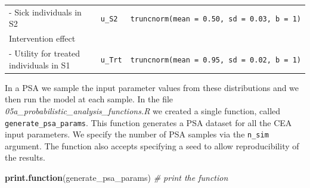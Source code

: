 \documentclass[]{book}
\newenvironment{Shaded}{\begin{snugshade}}{\end{snugshade}}
\newcommand{\KeywordTok}[1]{\textcolor[rgb]{0.13,0.29,0.53}{\textbf{#1}}}
\newcommand{\CommentTok}[1]{\textcolor[rgb]{0.56,0.35,0.01}{\textit{#1}}}
\newcommand{\NormalTok}[1]{#1}
\begin{document}
\begin{longtable}[]{@{}lll@{}}
\begin{minipage}[t]{0.33\columnwidth}
- Sick individuals in S2\strut
\end{minipage} & \begin{minipage}[t]{0.13\columnwidth}\raggedright\strut
\texttt{u\_S2}\strut
\end{minipage} & \begin{minipage}[t]{0.45\columnwidth}\raggedright\strut
\texttt{truncnorm(mean\ =\ 0.50,\ sd\ =\ 0.03,\ b\ =\ 1)}\strut
\end{minipage}\tabularnewline
\begin{minipage}[t]{0.33\columnwidth}\raggedright\strut
Intervention effect\strut
\end{minipage} & \begin{minipage}[t]{0.13\columnwidth}\raggedright\strut
\strut
\end{minipage} & \begin{minipage}[t]{0.45\columnwidth}\raggedright\strut
\strut
\end{minipage}\tabularnewline
\begin{minipage}[t]{0.33\columnwidth}\raggedright\strut
- Utility for treated individuals in S1\strut
\end{minipage} & \begin{minipage}[t]{0.13\columnwidth}\raggedright\strut
\texttt{u\_Trt}\strut
\end{minipage} & \begin{minipage}[t]{0.45\columnwidth}\raggedright\strut
\texttt{truncnorm(mean\ =\ 0.95,\ sd\ =\ 0.02,\ b\ =\ 1)}\strut
\end{minipage}\tabularnewline
\bottomrule
\end{longtable}

In a PSA we sample the input parameter values from these distributions
and we then run the model at each sample. In the file
\emph{05a\_probabilistic\_analysis\_functions.R} we created a single
function, called \texttt{generate\_psa\_params}. This function generates
a PSA dataset for all the CEA input parameters. We specify the number of
PSA samples via the \texttt{n\_sim} argument. The function also accepts
specifying a seed to allow reproducibility of the results.

\begin{Shaded}
\begin{Highlighting}[]
\KeywordTok{print.function}\NormalTok{(generate_psa_params) }\CommentTok{# print the function }
\end{Highlighting}
\end{Shaded}
\end{document}
